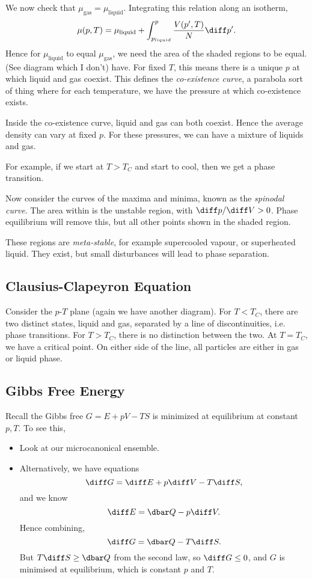 \documentclass[12pt]{article}
\begin{document}
We now check that $\mu_{\mathrm{gas}} = \mu_{\mathrm{liquid}}$. Integrating this relation along an isotherm,
\[
\mu(p, T) = \mu_{\mathrm{liquid}} + \int_{p_{liquid}}^p \frac{V(p', T)}{N} \diff p'.
\]
Hence for $\mu_{\mathrm{liquid}}$ to equal $\mu_{\mathrm{gas}}$, we need the area of the shaded regions to be equal. (See diagram which I don't) have. For fixed $T$, this means there is a unique $p$ at which liquid and gas coexist. This defines the \emph{co-existence curve}, a parabola sort of thing where for each temperature, we have the pressure at which co-existence exists.

Inside the co-existence curve, liquid and gas can both coexist. Hence the average density can vary at fixed $p$. For these pressures, we can have a mixture of liquids and gas.

For example, if we start at $T > T_C$ and start to cool, then we get a phase transition.

Now consider the curves of the maxima and minima, known as the \emph{spinodal curve}. The area within is the unstable region, with $\diff p / \diff V > 0$. Phase equilibrium will remove this, but all other points shown in the shaded region.

These regions are \emph{meta-stable}, for example supercooled vapour, or superheated liquid. They exist, but small disturbances will lead to phase separation.

\subsection{Clausius-Clapeyron Equation}
\label{sub:cceq}

Consider the $p$-$T$ plane (again we have another diagram). For $T < T_C$, there are two distinct states, liquid and gas, separated by a line of discontinuities, i.e. phase transitions. For $T > T_C$, there is no distinction between the two. At $T = T_C$, we have a critical point. On either side of the line, all particles are either in gas or liquid phase.

\subsection{Gibbs Free Energy}
\label{sub:gfe}

Recall the Gibbs free $G = E + p V - T S$ is minimized at equilibrium at constant $p, T$. To see this,
\begin{itemize}
	\item Look at our microcanonical ensemble.
	\item Alternatively, we have equations
		\[
		\diff G = \diff E + p \diff V - T \diff S,
		\]
		and we know
		\[
		\diff E = \dbar Q - p \diff V.
		\]
		Hence combining,
		\[
		\diff G = \dbar Q - T \diff S.
		\]
		But $T \diff S \geq \dbar Q$ from the second law, so $\diff G \leq 0$, and $G$ is minimised at equilibrium, which is constant $p$ and $T$.
\end{itemize}
\end{document}
